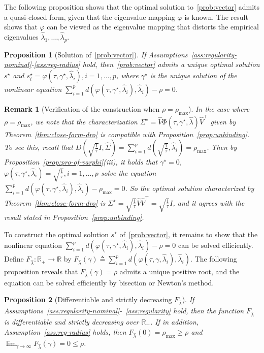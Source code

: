 \documentclass[11pt]{article}
\def\R{\mathbb{R}}
\newtheorem{proposition}{Proposition}
\newtheorem{remark}{Remark}
\newcommand{\opt}{^\star}
\newcommand{\Let}{\triangleq}
\def\transpose{\top}
\def\R{\mathbb{R}}
\newcommand{\wh}{\widehat}
\begin{document}
The following proposition shows that the optimal solution to~\eqref{prob:vector} admits a quasi-closed form, given that the eigenvalue mapping $\varphi$ is known. The result shows that $\varphi$ can be viewed as the eigenvalue mapping that distorts the empirical eigenvalues $\wh{\lambda}_1,\ldots,\wh{\lambda}_p$.


\begin{proposition}[Solution of~\eqref{prob:vector}]\label{prop:solve-prob-vector}
    If Assumptions~\ref{ass:regularity-nominal}-\ref{ass:reg-radius} hold, then~\eqref{prob:vector} admits a unique optimal solution $s\opt$ and $s_i\opt=\varphi(\tau, \gamma\opt, \widehat{\lambda}_i),i=1,\ldots,p$, where $\gamma\opt$ is the unique solution of the nonlinear equation $\sum_{i=1}^p d(\varphi(\tau, \gamma\opt, \widehat{\lambda}_i), \widehat{\lambda}_i)- \rho=0$.
\end{proposition}

\begin{remark}[Verification of the construction when $\rho=\rho_{\max}$]
    In the case where $ \rho =  \rho_{\max}$, we note that the characterization $\Sigma\opt=\widehat{V}\Phi(\tau, \gamma\opt, \widehat{\lambda})\widehat{V}^\transpose$ given by Theorem~\ref{thm:close-form-dro} is compatible with Proposition~\ref{prop:unbinding}. To see this, recall that 
    $D\left(\sqrt{\frac{1}{\tau}}I, \wh \Sigma\right)=\sum_{i=1}^pd\left(\sqrt{\frac{1}{\tau}},\widehat{\lambda}_i\right)= \rho_{\max}$. Then by Proposition~\ref{prop:pro-of-varphi}(iii), it holds that $\gamma\opt=0$, $\varphi(\tau, \gamma\opt, \widehat{\lambda}_i) = \sqrt{\frac{1}{\tau}}, i=1,\ldots,p$ solve the equation $\sum_{i=1}^p d(\varphi(\tau, \gamma\opt, \widehat{\lambda}_i), \widehat{\lambda}_i)- \rho_{\max}=0$.
    So the optimal solution characterized by Theorem~\ref{thm:close-form-dro} is $\Sigma\opt = \sqrt{\frac{1}{\tau}}\wh V \wh V^\transpose = \sqrt{\frac{1}{\tau}}I$, and it agrees with the result stated in Proposition~\ref{prop:unbinding}. 
\end{remark}

To construct the optimal solution $s\opt$ of~\eqref{prob:vector}, it remains to show that the nonlinear equation $\sum_{i=1}^p d(\varphi(\tau, \gamma\opt, \widehat{\lambda}_i), \widehat{\lambda}_i)- \rho=0$ can be solved efficiently. Define $F_{\wh\lambda}:\R_+ \to\R$ by $F_{\wh\lambda}(\gamma)\Let\sum_{i=1}^p d(\varphi(\tau, \gamma, \widehat{\lambda}_i), \widehat{\lambda}_i)$. The following proposition reveals that $F_{\wh\lambda}(\gamma)= \rho$ admits a unique positive root, and the equation can be solved efficiently by bisection or Newton's method.
\begin{proposition}[Differentiable and strictly decreasing $F_{\wh\lambda}$]\label{prop:property-of-F}
    If Assumptions~\ref{ass:regularity-nominal}-~\ref{ass:regularity} hold, then the function $F_{\wh\lambda}$ is differentiable and strictly decreasing over $\R_+$. If in addition, Assumption~\ref{ass:reg-radius} holds, then $F_{\wh\lambda}(0) =  \rho_{\max} \geq  \rho$ and $\lim_{\gamma\to\infty} F_{\wh\lambda}(\gamma) = 0 \leq  \rho$.
\end{proposition}
\end{document}
